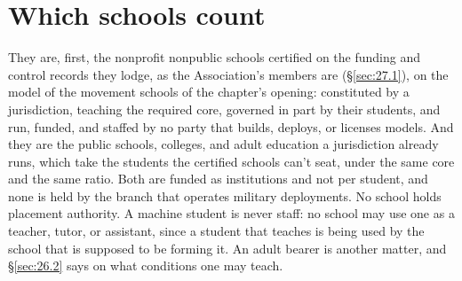 \section{Which schools count}
\label{sec:26.11}
They are, first, the nonprofit nonpublic schools certified on the funding and control records they lodge, as the Association's members are (\S\ref{sec:27.1}), on the model of the movement schools of the chapter's opening: constituted by a jurisdiction, teaching the required core, governed in part by their students, and run, funded, and staffed by no party that builds, deploys, or licenses models. And they are the public schools, colleges, and adult education a jurisdiction already runs, which take the students the certified schools can't seat, under the same core and the same ratio. Both are funded as institutions and not per student, and none is held by the branch that operates military deployments. No school holds placement authority. A machine student is never staff: no school may use one as a teacher, tutor, or assistant, since a student that teaches is being used by the school that is supposed to be forming it. An adult bearer is another matter, and \S\ref{sec:26.2} says on what conditions one may teach.
